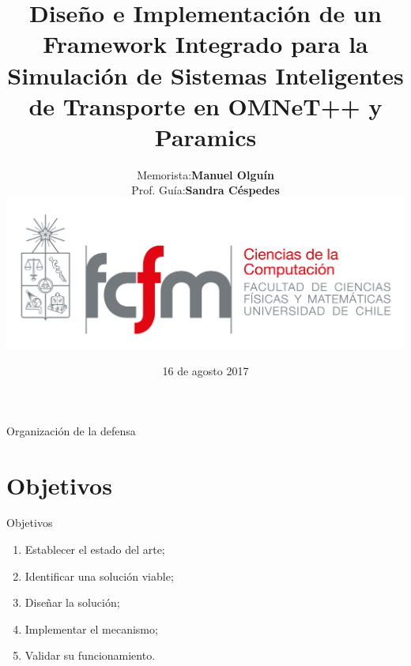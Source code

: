 \documentclass[aspectratio=169]{beamer}
\begin{document}
    
\title[]{Diseño e Implementación de un Framework Integrado para la Simulación de Sistemas Inteligentes de Transporte en OMNeT++ y Paramics}
\date{16 de agosto 2017}
\author[Olguín]{%
\begin{minipage}{.5\linewidth}
    \begin{tabular}{@{}ll@{}}
        Memorista:   & \textbf{Manuel Olguín}   \\
        Prof. Guía: & \textbf{Sandra Céspedes}  \\
    \end{tabular}
\end{minipage}%
\begin{minipage}{.5\linewidth}
    \centering
    \includegraphics[width=\linewidth]{figuras/fcfm_dcc_png.png}
\end{minipage}  
}

\begin{frame}
\titlepage
\end{frame}



\begin{frame}{Organización de la defensa}
\tableofcontents
\note{
    \tableofcontents
}
\end{frame}

\section{Objetivos}
\begin{frame}{Objetivos}
\begin{enumerate}
    \item Establecer el estado del arte;\pause
    \item Identificar una solución viable;\pause
    \item Diseñar la solución;\pause
    \item Implementar el mecanismo;\pause
    \item Validar su funcionamiento.
\end{enumerate}
\end{frame}
\end{document}
